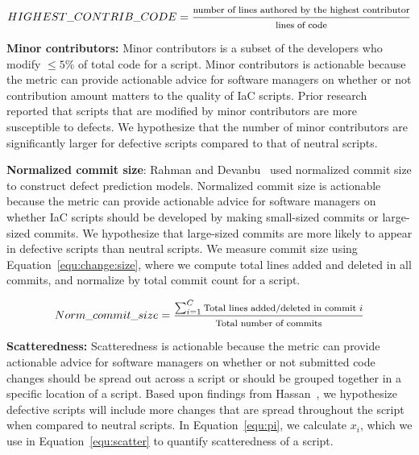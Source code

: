 \documentclass[smallextended]{svjour3}       %
\begin{document}
\begin{equation}
\footnotesize{HIGHEST\_CONTRIB\_CODE} = \frac{\text{\footnotesize{number of lines authored by the highest contributor}}}{\text{\footnotesize{lines of code}}}
\label{equ:highest}
\end{equation}

\textbf{Minor contributors:} Minor contributors is a subset of the developers who modify $\le5\%$ of total code for a script. Minor contributors is actionable because the metric can provide actionable advice for software managers on whether or not contribution amount matters to the quality of IaC scripts. Prior research~\citep{Devanbu:Process:Better} reported that scripts that are modified by minor contributors are more susceptible to defects. We hypothesize that the number of minor contributors are significantly larger for defective scripts compared to that of neutral scripts.   

\textbf{Normalized commit size}: Rahman and Devanbu~\citep{Devanbu:Process:Better} used normalized commit size to construct defect prediction models. Normalized commit size is actionable because the metric can provide actionable advice for software managers on whether IaC scripts should be developed by making small-sized commits or large-sized commits. We hypothesize that large-sized commits are more likely to appear in defective scripts than neutral scripts. We measure commit size using Equation~\ref{equ:change:size}, where we compute total lines added and deleted in all commits, and normalize by total commit count for a script.  

\begin{multline}
\footnotesize{Norm\_commit\_size} = 
\frac{\sum_{i=1}^{C}\text{\footnotesize{Total lines added/deleted in commit $i$}}}{\text{\footnotesize{Total number of commits}}}
\label{equ:change:size}
\end{multline}

\textbf{Scatteredness:} Scatteredness is actionable because the metric can provide actionable advice for software managers on whether or not submitted code changes should be spread out across a script or should be grouped together in a specific location of a script. Based upon findings from Hassan~\citep{Hassan:Entropy}, we hypothesize defective scripts will include more changes that are spread throughout the script when compared to neutral scripts. In Equation~\ref{equ:pi}, we calculate $x_i$, which we use in Equation~\ref{equ:scatter} to quantify scatteredness of a script. 
\end{document}
